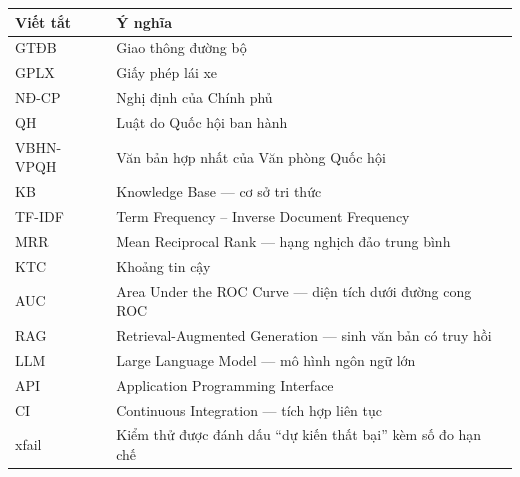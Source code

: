 \begin{center}
\renewcommand{\arraystretch}{1.15}
\begin{tabularx}{\textwidth}{@{}l L@{}}
\toprule
\textbf{Viết tắt} & \textbf{Ý nghĩa} \\
\midrule
GTĐB      & Giao thông đường bộ \\
GPLX      & Giấy phép lái xe \\
NĐ-CP     & Nghị định của Chính phủ \\
QH        & Luật do Quốc hội ban hành \\
VBHN-VPQH & Văn bản hợp nhất của Văn phòng Quốc hội \\
KB        & Knowledge Base --- cơ sở tri thức \\
TF-IDF    & Term Frequency -- Inverse Document Frequency \\
MRR       & Mean Reciprocal Rank --- hạng nghịch đảo trung bình \\
KTC       & Khoảng tin cậy \\
AUC       & Area Under the ROC Curve --- diện tích dưới đường cong ROC \\
RAG       & Retrieval-Augmented Generation --- sinh văn bản có truy hồi \\
LLM       & Large Language Model --- mô hình ngôn ngữ lớn \\
API       & Application Programming Interface \\
CI        & Continuous Integration --- tích hợp liên tục \\
xfail     & Kiểm thử được đánh dấu ``dự kiến thất bại'' kèm số đo hạn chế \\
\bottomrule
\end{tabularx}
\end{center}
